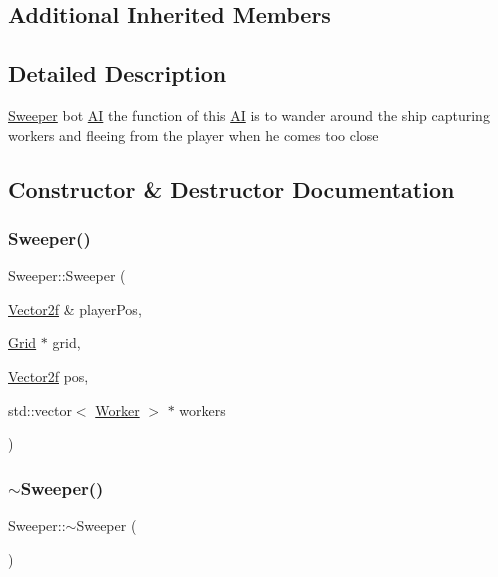 \subsection*{Additional Inherited Members}


\subsection{Detailed Description}
\mbox{\hyperlink{class_sweeper}{Sweeper}} bot \mbox{\hyperlink{class_a_i}{AI}} the function of this \mbox{\hyperlink{class_a_i}{AI}} is to wander around the ship capturing workers and fleeing from the player when he comes too close 

\subsection{Constructor \& Destructor Documentation}
\mbox{\label{class_sweeper_a0abeb1949c394caaf87dc35f8577b381}} 
\subsubsection{\texorpdfstring{Sweeper()}{Sweeper()}}
{\footnotesize\ttfamily Sweeper\+::\+Sweeper (\begin{DoxyParamCaption}\item[{\mbox{\hyperlink{class_vector2f}{Vector2f}} \&}]{player\+Pos,  }\item[{\mbox{\hyperlink{class_grid}{Grid}} $\ast$}]{grid,  }\item[{\mbox{\hyperlink{class_vector2f}{Vector2f}}}]{pos,  }\item[{std\+::vector$<$ \mbox{\hyperlink{class_worker}{Worker}} $>$ $\ast$}]{workers }\end{DoxyParamCaption})}

\mbox{\label{class_sweeper_a3099037dc68c87b680a8b235fb61848c}} 
\subsubsection{\texorpdfstring{$\sim$Sweeper()}{~Sweeper()}}
{\footnotesize\ttfamily Sweeper\+::$\sim$\+Sweeper (\begin{DoxyParamCaption}{ }\end{DoxyParamCaption})}



